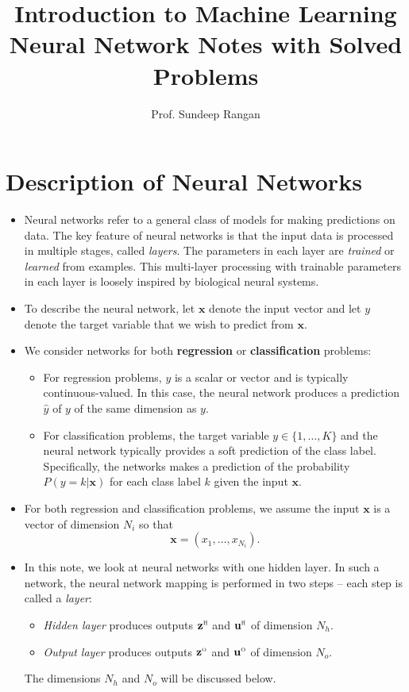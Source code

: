 \documentclass[11pt]{article}
\newcommand{\ubf}{\mathbf{u}}
\newcommand{\xbf}{\mathbf{x}}
\newcommand{\zbf}{\mathbf{z}}
\def\hid{\textsc{\tiny H}}
\def\out{\textsc{\tiny O}}
\begin{document}
\title{Introduction to Machine Learning\\
Neural Network Notes with Solved Problems}
\author{Prof. Sundeep Rangan}
\date{}

\maketitle

\section{Description of Neural Networks}
\begin{itemize}
\item Neural networks refer to a general class of models for making predictions on
data.  The key feature of neural networks is that the input data is processed in
multiple stages, called \emph{layers}.  The parameters in each layer are \emph{trained}
or \emph{learned} from examples.  This multi-layer processing
with trainable parameters in each layer is loosely inspired by biological neural systems.
\item To describe the neural network, let $\xbf$ denote the input vector and
let $y$ denote the target variable that we wish to predict from $\xbf$.
\item We consider networks for both \textbf{regression} or \textbf{classification} problems:
\begin{itemize}
\item For regression problems, $y$ is a scalar or vector and is typically continuous-valued.
In this case, the neural network produces a prediction $\hat{y}$ of $y$ of the same dimension as $y$.
\item For classification problems, the target variable $y \in \{1,\ldots,K\}$ and the neural network
typically provides a soft prediction of the class label.
Specifically, the networks makes a prediction of the probability $P(y=k|\xbf)$ for each class label $k$
given the input $\xbf$.
\end{itemize}
\item For both regression and classification problems,
we assume the input $\xbf$ is a vector of dimension $N_i$ so that
\[
    \xbf = (x_1,\ldots,x_{N_i}).
\]

\item In this note, we look at neural networks with one hidden layer.
In such a network, the neural network mapping is performed in two steps -- each step is called a \emph{layer}:
\begin{itemize}
\item \emph{Hidden layer} produces outputs $\zbf^\hid$ and $\ubf^\hid$ of dimension $N_h$.
\item \emph{Output layer} produces outputs $\zbf^\out$ and $\ubf^\out$ of dimension $N_o$.
\end{itemize}
The dimensions $N_h$ and $N_o$ will be discussed below.


\end{itemize}
\end{document}
